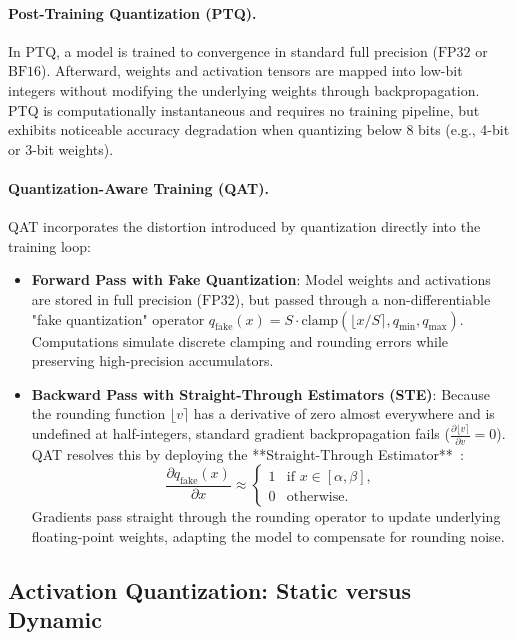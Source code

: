 \documentclass[../../../main.tex]{subfiles}
\begin{document}
\paragraph{Post-Training Quantization (PTQ).}
In PTQ, a model is trained to convergence in standard full precision ($\text{FP32}$ or $\text{BF16}$). Afterward, weights and activation tensors are mapped into low-bit integers without modifying the underlying weights through backpropagation. PTQ is computationally instantaneous and requires no training pipeline, but exhibits noticeable accuracy degradation when quantizing below 8 bits (e.g., 4-bit or 3-bit weights).

\paragraph{Quantization-Aware Training (QAT).}
QAT incorporates the distortion introduced by quantization directly into the training loop:
\begin{itemize}
    \item \textbf{Forward Pass with Fake Quantization}: Model weights and activations are stored in full precision ($\text{FP32}$), but passed through a non-differentiable "fake quantization" operator $q_{\text{fake}}(x) = S \cdot \text{clamp}\left(\lfloor x/S \rceil, q_{\min}, q_{\max}\right)$. Computations simulate discrete clamping and rounding errors while preserving high-precision accumulators.
    \item \textbf{Backward Pass with Straight-Through Estimators (STE)}: Because the rounding function $\lfloor v \rceil$ has a derivative of zero almost everywhere and is undefined at half-integers, standard gradient backpropagation fails ($\frac{\partial \lfloor v \rceil}{\partial v} = 0$). QAT resolves this by deploying the **Straight-Through Estimator**~\citep{bengio2013estimating}:
    \begin{equation}
    \label{eq:ste_derivative}
    \frac{\partial q_{\text{fake}}(x)}{\partial x} \approx \begin{cases} 1 & \text{if } x \in [\alpha, \beta], \\ 0 & \text{otherwise}. \end{cases}
    \end{equation}
    Gradients pass straight through the rounding operator to update underlying floating-point weights, adapting the model to compensate for rounding noise.
\end{itemize}

\subsection{Activation Quantization: Static versus Dynamic}
\label{subsec:static_vs_dynamic_quant}
\end{document}

